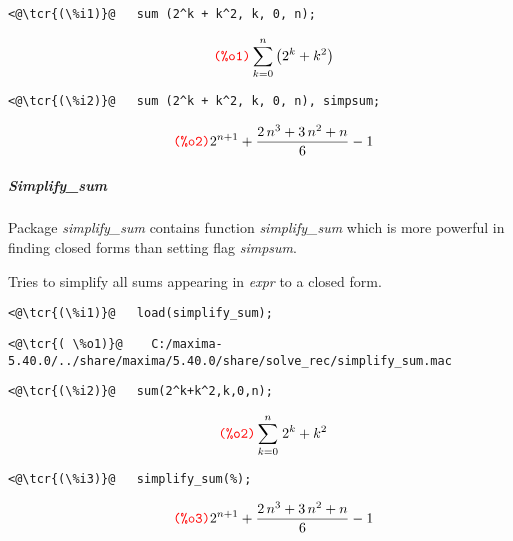 \documentclass[../Maxima_Workbook.tex]{subfiles}
\begin{document}
\lz \begin{small}
\color{blue} \leqn
\begin{lstlisting}
<@\tcr{(\%i1)}@   sum (2^k + k^2, k, 0, n);
\end{lstlisting}
\vspace{-5mm} \[\tag*{\tcr{\ttfamily (\%o1)}} \sum_{k=0}^{n}{\left(2^{k}+k^2\right)} \]
\vspace{-5mm} \begin{lstlisting}
<@\tcr{(\%i2)}@   sum (2^k + k^2, k, 0, n), simpsum;
\end{lstlisting}
\vspace{-4mm} \[\tag*{\tcr{\ttfamily (\%o2)}} 2^{n+1}+{{2\,n^3+3\,n^2+n}\over{6}}-1 \]
\color{black} \reqn
\end{small} \vspace{-5mm} 

\subparagraph{Simplify\_sum} \mbox{}

\lz Package \emph{simplify\_sum} contains function \emph{simplify\_sum} which is more powerful in finding closed forms than setting flag \emph{simpsum}.

\lzz {} \hfill {}

\lz Tries to simplify all sums appearing in \emph{expr} to a closed form.

\lz \begin{small}
\color{blue} \leqn
\begin{lstlisting}
<@\tcr{(\%i1)}@   load(simplify_sum);
\end{lstlisting}
\vspace{-3mm} \begin{lstlisting}[basicstyle=\footnotesize]
<@\tcr{( \%o1)}@    C:/maxima-5.40.0/../share/maxima/5.40.0/share/solve_rec/simplify_sum.mac
\end{lstlisting}
\vspace{-3mm} \begin{lstlisting}
<@\tcr{(\%i2)}@   sum(2^k+k^2,k,0,n);
\end{lstlisting}
\vspace{-4mm} \[\tag*{\tcr{\ttfamily (\%o2)}} \sum_{k=0}^{n}{\left. {{2}^{k}}+{{k}^{2}}\right.} \]
\vspace{-5mm} \begin{lstlisting}
<@\tcr{(\%i3)}@   simplify_sum(%);
\end{lstlisting}
\vspace{-4mm} \[\tag*{\tcr{\ttfamily (\%o3)}} 2^{n+1}+{{2\,n^3+3\,n^2+n}\over{6}}-1 \]
\color{black} \reqn
\end{small} \vspace{-5mm}
\end{document}
